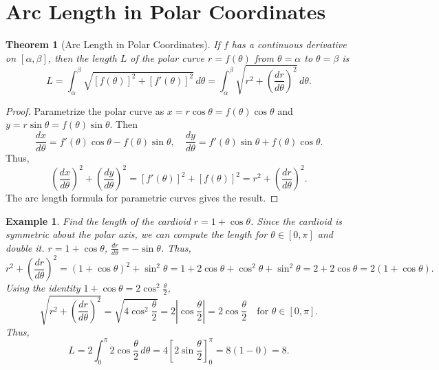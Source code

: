 \documentclass[11pt,a4paper]{article}
\newtheorem{example}{Example}
\newtheorem{theorem}{Theorem}
\begin{document}
\section{Arc Length in Polar Coordinates}
\begin{theorem}[Arc Length in Polar Coordinates]
If $f$ has a continuous derivative on $[\alpha, \beta]$, then the length $L$ of the polar curve $r = f(\theta)$ from $\theta = \alpha$ to $\theta = \beta$ is
\[
L = \int_{\alpha}^{\beta} \sqrt{[f(\theta)]^2 + [f'(\theta)]^2} \, d\theta = \int_{\alpha}^{\beta} \sqrt{r^2 + \left( \frac{dr}{d\theta} \right)^2} \, d\theta.
\]
\end{theorem}
\begin{proof}
Parametrize the polar curve as $x = r \cos \theta = f(\theta) \cos \theta$ and $y = r \sin \theta = f(\theta) \sin \theta$. Then
\[
\frac{dx}{d\theta} = f'(\theta) \cos \theta - f(\theta) \sin \theta, \quad \frac{dy}{d\theta} = f'(\theta) \sin \theta + f(\theta) \cos \theta.
\]
Thus,
\[
\left( \frac{dx}{d\theta} \right)^2 + \left( \frac{dy}{d\theta} \right)^2 = [f'(\theta)]^2 + [f(\theta)]^2 = r^2 + \left( \frac{dr}{d\theta} \right)^2.
\]
The arc length formula for parametric curves gives the result.
\end{proof}
\begin{center}
\end{center}
\begin{example}
Find the length of the cardioid $r = 1 + \cos \theta$.
Since the cardioid is symmetric about the polar axis, we can compute the length for $\theta \in [0, \pi]$ and double it.
$r = 1 + \cos \theta$, $\frac{dr}{d\theta} = -\sin \theta$. Thus,
\[
r^2 + \left( \frac{dr}{d\theta} \right)^2 = (1 + \cos \theta)^2 + \sin^2 \theta = 1 + 2\cos \theta + \cos^2 \theta + \sin^2 \theta = 2 + 2\cos \theta = 2(1 + \cos \theta).
\]
Using the identity $1 + \cos \theta = 2 \cos^2 \frac{\theta}{2}$,
\[
\sqrt{r^2 + \left( \frac{dr}{d\theta} \right)^2} = \sqrt{4 \cos^2 \frac{\theta}{2}} = 2 \left| \cos \frac{\theta}{2} \right| = 2 \cos \frac{\theta}{2} \quad \text{for } \theta \in [0, \pi].
\]
Thus,
\[
L = 2 \int_0^{\pi} 2 \cos \frac{\theta}{2} \, d\theta = 4 \left[ 2 \sin \frac{\theta}{2} \right]_0^{\pi} = 8 (1 - 0) = 8.
\]
\end{example}
\end{document}
